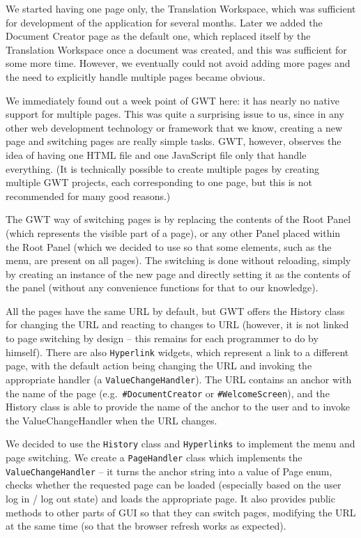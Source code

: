 {We started having one page only, the Translation Workspace, which was sufficient for development of the application for several months. Later we added the Document  Creator page as the default one, which replaced itself by the Translation Workspace once a document was created, and this was sufficient for some more time. However, we eventually could not avoid adding more pages and the need to explicitly handle multiple pages became obvious.

We immediately found out a week point of GWT here: it has nearly no native support for multiple pages. This was quite a surprising issue to us, since in any other web development technology or framework that we know, creating a new page and switching pages are really simple tasks. GWT, however, observes the idea of having one HTML file and one JavaScript file only that handle everything. (It is technically possible to create multiple pages by creating multiple GWT projects, each corresponding to one page, but this is not recommended for many good reasons.)

The GWT way of switching pages is by replacing the contents of the Root Panel (which represents the visible part of a page), or any other Panel placed within the Root Panel (which we decided to use so that some elements, such as the menu, are present on all pages). The switching is done without reloading, simply by creating an instance of the new page and directly setting it as the contents of the panel (without any convenience functions for that to our knowledge).

All the pages have the same URL by default, but GWT offers the History class for changing the URL and reacting to changes to URL (however, it is not linked to page switching by design -- this remains for each programmer to do by himself). There are also {\tt Hyperlink} widgets, which represent a link to a different page, with the default action being changing the URL and invoking the appropriate handler (a {\tt ValueChangeHandler}).
The URL contains an anchor with the name of the page (e.g.\ {\tt \#DocumentCreator} or {\tt \#WelcomeScreen}), and the History class is able to provide the name of the anchor to the user and to invoke the ValueChangeHandler when the URL changes.

We decided to use the {\tt History} class and {\tt Hyperlinks} to implement the menu and page switching. We create a {\tt PageHandler} class which implements the {\tt ValueChangeHandler} -- it turns the anchor string into a value of Page enum, checks whether the requested page can be loaded (especially based on the user log in / log out state) and loads the appropriate page. It also provides public methods to other parts of GUI so that they can switch pages, modifying the URL at the same time (so that the browser refresh works as expected).

}
